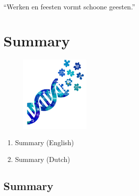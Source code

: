 \begin{savequote}[75mm]
``Werken en feesten vormt schoone geesten.''
\end{savequote}

\chapter{Summary}\label{chapter:summary}
\setcounter{figure}{-1}
\setcounter{table}{-1}
\setcounter{section}{-1}
\setcounter{NAT@ctr}{-1}

\begin{figure}[t!]
\includegraphics[height=10em]{frontmatter/images/samenvatting.png}
\end{figure}

\begin{enumerate}[label=\ref{chapter:summary}.\arabic*]
\itemsep-0.5em
\setcounter{enumi}{-1}
\item Summary (English)
\item Summary (Dutch)
\end{enumerate}


\section{Summary}

